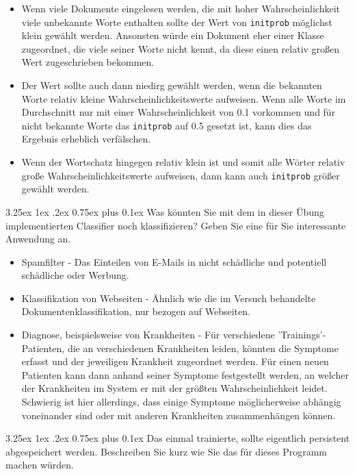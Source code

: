 \documentclass[12pt,a4paper]{scrartcl}
\makeatletter
\renewcommand\subparagraph{\@startsection{subparagraph}{5}{\parindent}%
    {3.25ex \@plus1ex \@minus .2ex}%
    {0.75ex plus 0.1ex}%
    {\normalfont\normalsize\bfseries}}
\makeatother
\begin{document}
\begin{itemize}
\item{ Wenn viele Dokumente eingelesen werden, die mit hoher Wahrscheinlichkeit viele unbekannte Worte enthalten sollte der Wert von \lstinline{initprob} m\"oglichst klein gew\"ahlt werden. Ansonsten w\"urde ein Dokument eher einer Klasse zugeordnet, die viele seiner Worte nicht kennt, da diese einen relativ gro\ss en Wert zugeschrieben bekommen. }
\item{ Der Wert sollte auch dann niedirg gew\"ahlt werden, wenn die bekannten Worte relativ kleine Wahrscheinlichkeitswerte aufweisen. Wenn alle Worte im Durchschnitt nur mit einer Wahrscheinlichkeit von 0.1 vorkommen und f\"ur nicht bekannte Worte das \lstinline{initprob} auf 0.5 gesetzt ist, kann dies das Ergebnis erheblich verf\"alschen.}
\item{ Wenn der Wortschatz hingegen relativ klein ist und somit alle W\"orter relativ gro\ss e Wahrscheinlichkeitswerte aufweisen, dann kann auch \lstinline|initprob| gr\"o\ss er gew\"ahlt werden.} 
\end{itemize} 

\subparagraph{Was k\"onnten Sie mit dem in dieser \"Ubung implementierten Classifier noch klassifizieren? Geben Sie eine f\"ur Sie interessante Anwendung an.}

\begin{itemize}
\item Spamfilter - Das Einteilen von E-Mails in nicht sch\"adliche und potentiell sch\"adliche oder Werbung. 
\item Klassifikation von Webseiten - \"Ahnlich wie die im Versuch behandelte Dokumentenklassifikation, nur bezogen auf Webseiten. 
\item Diagnose, beispielsweise von Krankheiten - F\"ur verschiedene 'Trainings'-Patienten, die an verschiedenen Krankheiten leiden, k\"onnten die Symptome erfasst und der jeweiligen Krankheit zugeordnet werden. F\"ur einen neuen Patienten kann dann anhand seiner Symptome festgestellt werden, an welcher der Krankheiten im System er mit der gr\"o\ss ten Wahrscheinlichkeit leidet. Schwierig ist hier allerdings, dass einige Symptome m\"oglicherweise abh\"angig voneinander sind oder mit anderen Krankheiten zusammenh\"angen k\"onnen. 
\end{itemize}


\subparagraph{Das einmal trainierte, sollte eigentlich persistent abgespeichert werden. Beschreiben Sie kurz wie Sie das f\"ur dieses Programm machen w\"urden.}
\end{document}

